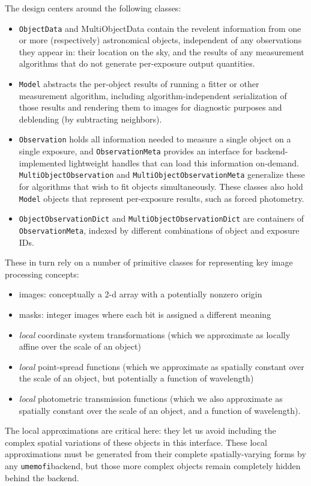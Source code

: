\documentclass[\docopts]{\docclass}
\begin{document}
The design centers around the following classes:
\begin{itemize}
\item \texttt{ObjectData} and {{MultiObjectData}} contain the revelent information from one or more (respectively) astronomical objects, independent of any observations they appear in: their location on the sky, and the results of any measurement algorithms that do not generate per-exposure output quantities.
\item \texttt{Model} abstracts the per-object results of running a fitter or other measurement algorithm, including algorithm-independent serialization of those results and rendering them to images for diagnostic purposes and deblending (by subtracting neighbors).
\item \texttt{Observation} holds all information needed to measure a single object on a single exposure, and \texttt{ObservationMeta} provides an interface for backend-implemented lightweight handles that can load this information on-demand.  \texttt{MultiObjectObservation} and \texttt{MultiObjectObservationMeta} generalize these for algorithms that wish to fit objects simultaneously.  These classes also hold \texttt{Model} objects that represent per-exposure results, such as forced photometry.
\item \texttt{ObjectObservationDict} and \texttt{MultiObjectObservationDict} are containers of \texttt{ObservationMeta}, indexed by different combinations of object and exposure IDs.
\end{itemize}
These in turn rely on a number of primitive classes for representing key image processing concepts:
\begin{itemize}
\item images: conceptually a 2-d array with a potentially nonzero origin
\item masks: integer images where each bit is assigned a different meaning
\item \emph{local} coordinate system transformations (which we approximate as locally affine over the scale of an object)
\item \emph{local} point-spread functions (which we approximate as spatially constant over the scale of an object, but potentially a function of wavelength)
\item \emph{local} photometric transmission functions (which we also approximate as spatially constant over the scale of an object, and a function of wavelength).
\end{itemize}
The local approximations are critical here: they let us avoid including the complex spatial variations of these objects in this interface.  These local approximations must be generated from their complete spatially-varying forms by any \texttt{umemofi}backend, but those more complex objects remain completely hidden behind the backend.
\end{document}
